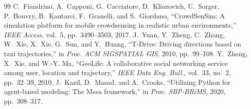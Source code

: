 \documentclass[12pt,draftcls,onecolumn]{IEEEtran}
\begin{document}
\begin{thebibliography}{99}
 C.~Fiandrino, A.~Capponi, G.~Cacciatore, D.~Kliazovich, U.~Sorger, P.~Bouvry, B.~Kantarci, F.~Granelli, and S.~Giordano, ``CrowdSenSim: A simulation platform for mobile crowdsensing in realistic urban environments,'' \emph{IEEE Access}, vol.~5, pp.~3490--3503, 2017.
 J.~Yuan, Y.~Zheng, C.~Zhang, W.~Xie, X.~Xie, G.~Sun, and Y.~Huang, ``T-Drive: Driving directions based on taxi trajectories,'' in \emph{Proc. ACM SIGSPATIAL GIS}, 2010, pp.~99--108.
 Y.~Zheng, X.~Xie, and W.-Y. Ma, ``GeoLife: A collaborative social networking service among user, location and trajectory,'' \emph{IEEE Data Eng. Bull.}, vol.~33, no.~2, pp.~32--39, 2010.
 J.~Kazil, D.~Masad, and A.~Crooks, ``Utilizing Python for agent-based modeling: The Mesa framework,'' in \emph{Proc. SBP-BRiMS}, 2020, pp.~308--317.
\end{thebibliography}
\end{document}
